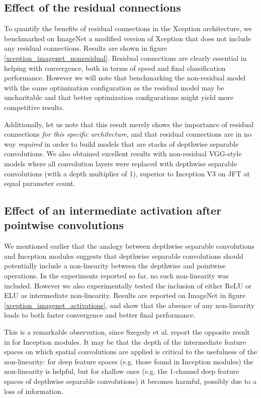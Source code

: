 \subsection{Effect of the residual connections}

To quantify the benefits of residual connections in the Xception architecture, we benchmarked on ImageNet a modified version of Xception that does not include any residual connections. Results are shown in figure \ref{xception_imagenet_nonresidual}. Residual connections are clearly essential in helping with convergence, both in terms of speed and final classification performance. However we will note that benchmarking the non-residual model with the same optimization configuration as the residual model may be uncharitable and that better optimization configurations might yield more competitive results.

Additionally, let us note that this result merely shows the importance of residual connections \textit{for this specific architecture}, and that residual connections are in no way \textit{required} in order to build models that are stacks of depthwise separable convolutions. We also obtained excellent results with non-residual VGG-style models where all convolution layers were replaced with depthwise separable convolutions (with a depth multiplier of 1), superior to Inception V3 on JFT at equal parameter count.

\subsection{Effect of an intermediate activation after pointwise convolutions}

We mentioned earlier that the analogy between depthwise separable convolutions and Inception modules suggests that depthwise separable convolutions should potentially include a non-linearity between the depthwise and pointwise operations. In the experiments reported so far, no such non-linearity was included. However we also experimentally tested the inclusion of either ReLU or ELU \cite{clevert15} as intermediate non-linearity. Results are reported on ImageNet in figure \ref{xception_imagenet_activations}, and show that the absence of any non-linearity leads to both faster convergence and better final performance.

This is a remarkable observation, since Szegedy et al. report the opposite result in \cite{szegedy2015rethinking} for Inception modules. It may be that the depth of the intermediate feature spaces on which spatial convolutions are applied is critical to the usefulness of the non-linearity: for deep feature spaces (e.g. those found in Inception modules) the non-linearity is helpful, but for shallow ones (e.g. the 1-channel deep feature spaces of depthwise separable convolutions) it becomes harmful, possibly due to a loss of information.

